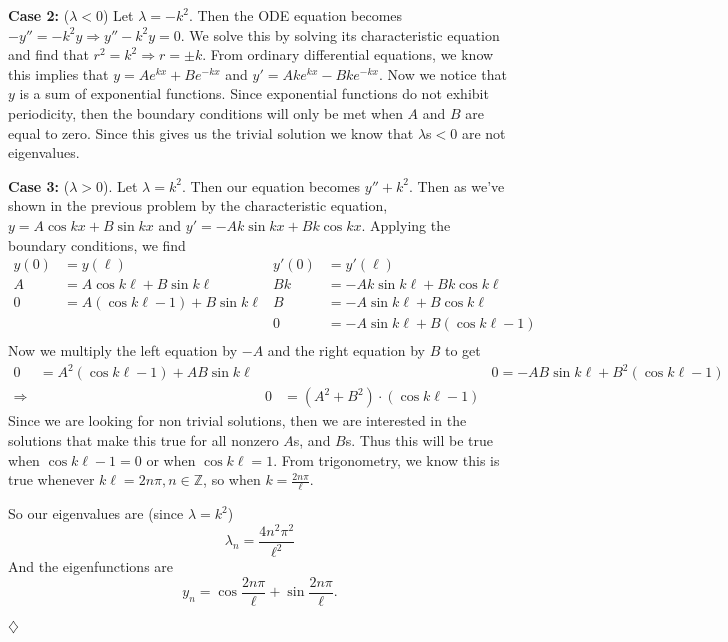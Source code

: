 \documentclass{article}
\begin{document}
\vspace{2mm}
\textbf{Case 2:} (\(\lambda <0\)) Let \(\lambda = -k^2\). Then the ODE equation becomes \(-y'' = -k^2y \Rightarrow y''-k^2y=0 \). We solve this by solving its characteristic equation and find that \(r^2 = k^2 \Rightarrow r= \pm k \). From ordinary differential equations, we know this implies that \(y=Ae^{kx} + Be^{-kx}\) and \(y' = Ake^{kx} - Bke^{-kx}\). Now we notice that \(y\) is a sum of exponential functions. Since exponential functions do not exhibit periodicity, then the boundary conditions will only be met when \(A\) and \(B\) are equal to zero. Since this gives us the trivial solution we know that \(\lambda\)s\(<0\) are not eigenvalues. 

\vspace{2mm}
\textbf{Case 3:} (\(\lambda >0\)). Let \(\lambda= k^2\). Then our equation becomes \(y'' + k^2\). Then as we've shown in the previous problem by the characteristic equation, \(y= A\cos kx + B\sin kx \) and \( y'=-Ak\sin kx + Bk\cos kx \). Applying the boundary conditions, we find 
\begin{align*}
y(0) &= y(\ell)  &    y'(0) &= y'(\ell) \\
 A &= A\cos k\ell+B\sin k\ell &  Bk&= -Ak\sin k\ell + Bk \cos k\ell \\
0 &= A(\cos k\ell-1)  +B \sin k\ell & B&=-A\sin k\ell + B \cos k\ell \\ 
& &0&= -A \sin k \ell + B(\cos k\ell-1) \\
\end{align*}
Now we multiply the left equation by \(-A\) and the right equation by \(B\) to get 
\begin{align*}
0&= A^2 (\cos k\ell -1) + AB \sin k \ell &&&    0=-AB\sin k \ell + B^2(\cos k\ell-1) \\
\Rightarrow&  &0 &=(A^2+B^2)\cdot(\cos k \ell-1)  &&
\end{align*}
Since we are looking for non trivial solutions, then we are interested in the solutions that make this true for all nonzero \(A\)s, and \(B\)s. Thus this will be true when \(\cos k\ell - 1 =0 \) or when \(\cos k\ell =1\). From trigonometry, we know this is true whenever \( k\ell = 2n\pi,  n\in \mathbb{Z}\), so when \(k= \frac{ 2n\pi}\ell\). 

So our eigenvalues are (since \(\lambda = k^2\))
\[
\lambda_n = \frac{ 4n^2\pi^2}{\ell^2} 
\]
And the eigenfunctions are 
\[
y_n = \cos \frac{ 2n\pi}\ell + \sin \frac{ 2n\pi}\ell.
\]

\begin{flushright}
\( \diamondsuit \)
\end{flushright}
\end{document}
